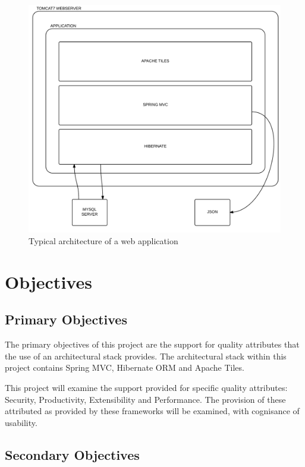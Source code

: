 \begin{figure}[H]
\begin{center}
\includegraphics[scale=0.24]{projarch.PNG}
\end{center}
\caption{Typical architecture of a web application}
\end{figure}

\section{Objectives}

\subsection{Primary Objectives}

The primary objectives of this project are the support for quality attributes that the use of an architectural stack provides. The architectural stack within this project contains Spring MVC, Hibernate ORM and Apache Tiles. 

This project will examine the support provided for specific quality attributes: Security, Productivity, Extensibility and Performance. The provision of these attributed as provided by these frameworks will be examined, with cognisance of usability. 

\subsection{Secondary Objectives}

